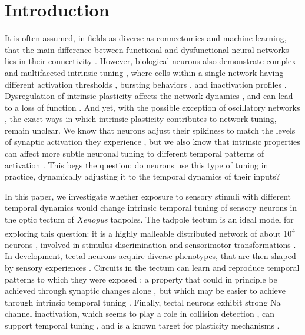 \documentclass{article}
\begin{document}
\section*{Introduction}

It is often assumed, in fields as diverse as connectomics and machine learning, that the main difference between functional and dysfunctional neural networks lies in their connectivity \citep{takemura2014, hildebrand2017, bassett2017network, reimann2017}. However, biological neurons also demonstrate complex and multifaceted intrinsic tuning  \citep{oleary2013,evans2015}, where cells within a single network having different activation thresholds \citep{kole2012}, bursting behaviors \citep{popovic2011}, and inactivation profiles \citep{bianchi2012}. Dysregulation of intrinsic plasticity affects the network dynamics  \citep{tien2018}, and can lead to a loss of function \citep{marcelin2009}. And yet, with the possible exception of oscillatory networks \citep{marder2011,picton2018control}, the exact ways in which intrinsic plasticity contributes to network tuning, remain unclear. We know that neurons adjust their spikiness to match the levels of synaptic activation they experience \citep{aizenman2003,titley2017}, but we also know that intrinsic properties can affect more subtle neuronal tuning to different temporal patterns of activation \citep{azouz2000threshold, branco2010dendritic, fontaine2014threshold, jarvis2018morphology, ohtsuki2018bursting, zbili2019axonnav}. This begs the question: do neurons use this type of tuning in practice, dynamically adjusting it to the temporal dynamics of their inputs?

In this paper, we investigate whether exposure to sensory stimuli with different temporal dynamics would change intrinsic temporal tuning of sensory neurons in the optic tectum of \textit{Xenopus} tadpoles. The tadpole tectum is an ideal model for exploring this question: it is a highly malleable distributed network of about 10\textsuperscript{4} neurons \citep{pratt2013}, involved in stimulus discrimination and sensorimotor transformations \citep{dong2009,khakhalin2014}. In development, tectal neurons acquire diverse phenotypes, that are then shaped by sensory experiences \citep{xu2011,ciarleglio2015}. Circuits in the tectum can learn and reproduce temporal patterns to which they were exposed \citep{pratt2008}: a property that could in principle be achieved through synaptic changes alone \citep{lukovsevivcius2009}, but which may be easier to achieve through intrinsic temporal tuning \citep{narayanan2008,beatty2014}. Finally, tectal neurons exhibit strong Na channel inactivation, which seems to play a role in collision detection \citep{jang2016}, can support temporal tuning \citep{clay2012optimal,fontaine2014threshold,zbili2019axonnav}, and is a known target for plasticity mechanisms \citep{bianchi2012}.
\end{document}
